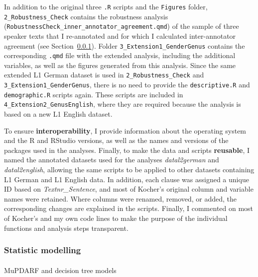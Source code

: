 \documentclass[
  letterpaper,
  DIV=11,
  numbers=noendperiod]{scrartcl}
\makeatletter
\let\oldparagraph\paragraph
\renewcommand{\paragraph}{
    \@ifstar
      \xxxParagraphStar
      \xxxParagraphNoStar
  }
\newcommand{\xxxParagraphStar}[1]{\oldparagraph*{#1}\mbox{}}
\newcommand{\xxxParagraphNoStar}[1]{\oldparagraph{#1}\mbox{}}
\makeatother
\begin{document}
In addition to the original three \texttt{.R} scripts and the
\texttt{Figures} folder, \texttt{2\_Robustness\_Check} contains the
robustness analysis
(\texttt{RobustnessCheck\_inner\_annotator\_agreement.qmd}) of the
sample of three speaker texts that I re-annotated and for which I
calculated inter-annotator agreement (see
Section~\ref{sec-statistical-modelling}). Folder
\texttt{3\_Extension1\_GenderGenus} contains the corresponding
\texttt{.qmd} file with the extended analysis, including the additional
variables, as well as the figures generated from this analysis. Since
the same extended L1 German dataset is used in
\texttt{2\_Robustness\_Check} and \texttt{3\_Extension1\_GenderGenus},
there is no need to provide the \texttt{descriptive.R} and
\texttt{demographic.R} scripts again. These scripts are included in
\texttt{4\_Extension2\_GenusEnglish}, where they are required because
the analysis is based on a new L1 English dataset.

To ensure \textbf{interoperability}, I provide information about the
operating system and the R and RStudio versions, as well as the names
and versions of the packages used in the analyses. Finally, to make the
data and scripts \textbf{reusable}, I named the annotated datasets used
for the analyses \emph{datal2german} and \emph{datal2english}, allowing
the same scripts to be applied to other datasets containing L1 German
and L1 English data. In addition, each clause was assigned a unique ID
based on \emph{Textnr\_Sentence}, and most of Kocher's original column
and variable names were retained. Where columns were renamed, removed,
or added, the corresponding changes are explained in the scripts.
Finally, I commented on most of Kocher's and my own code lines to make
the purpose of the individual functions and analysis steps transparent.

\subsubsection{Statistic modelling}\label{sec-statistical-modelling}

\paragraph{MuPDARF and decision tree
models}\label{mupdarf-and-decision-tree-models}
\end{document}
